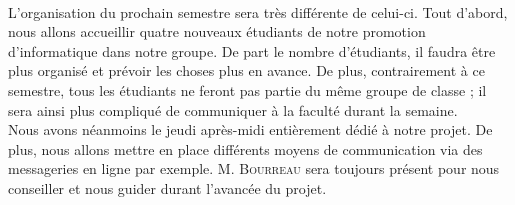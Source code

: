     \paragraph{}L'organisation du prochain semestre sera très différente de celui-ci. Tout d'abord, nous allons accueillir quatre nouveaux étudiants de notre promotion d'informatique dans notre groupe. De part le nombre d'étudiants, il faudra être plus organisé et prévoir les choses plus en avance. De plus, contrairement à ce semestre, tous les étudiants ne feront pas partie du même groupe de classe ; il sera ainsi plus compliqué de communiquer à la faculté durant la semaine.\\
    Nous avons néanmoins le jeudi après-midi entièrement dédié à notre projet. De plus, nous allons mettre en place différents moyens de communication via des messageries en ligne par exemple. M. \textsc{Bourreau} sera toujours présent pour nous conseiller et nous guider durant l'avancée du projet.
 